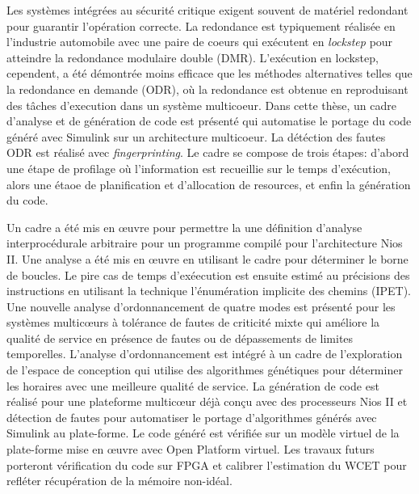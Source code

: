 \begin{abstract-fr}

	Les systèmes intégrées au sécurité critique exigent souvent de matériel redondant pour guarantir l'opération correcte. 
	La redondance est typiquement  réalisée en l'industrie automobile avec une paire de coeurs qui exécutent en \emph{lockstep} pour atteindre la redondance modulaire double (DMR). 
	L'exécution en lockstep, cependent, a été démontrée moins efficace que les méthodes alternatives telles que la redondance en demande (ODR), où la redondance est obtenue en reproduisant des tâches d'execution dans un système multicoeur. 
	Dans cette thèse, un cadre d'analyse et de génération de code est présenté qui automatise le portage du code généré avec Simulink sur un architecture multicoeur. La détéction des fautes ODR est réalisé avec \emph{fingerprinting}. 
	Le cadre se compose de trois étapes: d'abord une étape de profilage où l'information est recueillie sur le temps d'exécution, alors une étaoe de planification et d'allocation de resources, et enfin la génération du code. 
	
	Un cadre a été mis en œuvre pour permettre la une définition d'analyse interprocédurale arbitraire pour un programme compilé pour l'architecture Nios II.
	Une analyse a été mis en œuvre en utilisant le cadre pour déterminer le borne de boucles.
	Le pire cas de temps d'exéecution est ensuite estimé au précisions des instructions en utilisant la technique l'énumération implicite des chemins (IPET). 
	Une nouvelle analyse d'ordonnancement de quatre modes est présenté pour les systèmes multicœurs à tolérance de fautes de criticité mixte qui améliore la qualité de service en présence de fautes ou de dépassements de limites temporelles. 
	L'analyse d'ordonnancement est intégré à un cadre de l'exploration de l'espace de conception qui utilise des algorithmes génétiques pour déterminer les horaires avec une meilleure qualité de service. 
	La génération de code est réalisé pour une plateforme multicœur déjà conçu avec des processeurs Nios II et détection de fautes pour automatiser le portage d'algorithmes générés avec Simulink au plate-forme. 
	Le code généré est vérifiée sur un modèle virtuel de la plate-forme mise en œuvre avec Open Platform virtuel.
	Les travaux futurs porteront vérification du code sur FPGA et calibrer l'estimation du WCET pour refléter récupération de la mémoire non-idéal.


\end{abstract-fr}


